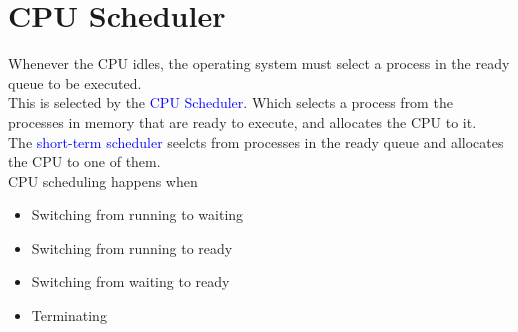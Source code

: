 \documentclass{book/custombook}
\begin{document}
        \section{CPU Scheduler}
            Whenever the CPU idles, the operating system must select a process in the ready queue to be 
            executed.\\
            This is selected by the \textcolor{blue}{CPU Scheduler}. Which selects a process from the processes
            in memory that are ready to execute, and allocates the CPU to it.\\
            The \textcolor{blue}{short-term scheduler} seelcts from processes in the ready queue and allocates 
            the CPU to one of them.\\
            CPU scheduling happens when
            \begin{itemize}
                \item Switching from running to waiting
                \item Switching from running to ready
                \item Switching from waiting to ready
                \item Terminating
            \end{itemize}
\end{document}
